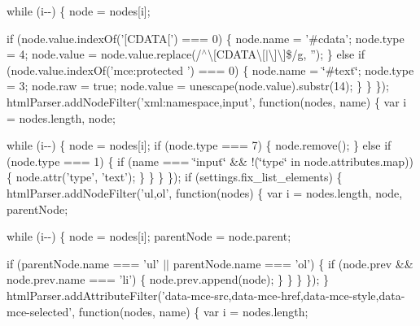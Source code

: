 \begin{DoxyCompactItemize}
{			while (i-\/-\/) \{
				node = nodes\mbox{[}i\mbox{]};

				if (node.\+value.\+index\+Of('\mbox{[}\+C\+D\+A\+T\+A\mbox{[}') === 0) \{
					node.\+name = '\#cdata';
					node.\+type = 4;
					node.\+value = node.\+value.\+replace(/$^\wedge$\textbackslash{}\mbox{[}\+C\+D\+A\+T\+A\textbackslash{}\mbox{[}$\vert$\textbackslash{}\mbox{]}\textbackslash{}\mbox{]}\$/g, '');
				\} else if (node.\+value.\+index\+Of('mce\+:protected ') === 0) \{
					node.\+name = \char`\"{}\#text\char`\"{};
					node.\+type = 3;
					node.\+raw = true;
					node.\+value = unescape(node.\+value).\+substr(14);
				\}
			\}
		\}); html\+Parser.\+add\+Node\+Filter('xml\+:namespace,input', function(nodes, name) \{
			var i = nodes.\+length, node;

			while (i-\/-\/) \{
				node = nodes\mbox{[}i\mbox{]};
				if (node.\+type === 7) \{
					node.\+remove();
				\} else if (node.\+type === 1) \{
					if (name === \char`\"{}input\char`\"{} \&\& !(\char`\"{}type\char`\"{} in node.\+attributes.\+map)) \{
						node.\+attr('type', 'text');
					\}
				\}
			\}
		\});  if (settings.\+fix\+\_\+list\+\_\+elements) \{ html\+Parser.\+add\+Node\+Filter('ul,ol', function(nodes) \{
				var i = nodes.\+length, node, parent\+Node;

				while (i-\/-\/) \{
					node = nodes\mbox{[}i\mbox{]};
					parent\+Node = node.\+parent;

					if (parent\+Node.\+name === 'ul' $\vert$$\vert$ parent\+Node.\+name === 'ol') \{
						if (node.\+prev \&\& node.\+prev.\+name === 'li') \{
							node.\+prev.\+append(node);
						\}
					\}
				\}
			\}); \}  html\+Parser.\+add\+Attribute\+Filter('data-\/mce-\/src,data-\/mce-\/href,data-\/mce-\/style,data-\/mce-\/selected', function(nodes, name) \{
			var i = nodes.\+length;

}
\end{DoxyCompactItemize}
